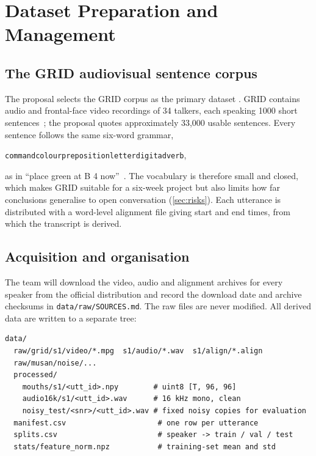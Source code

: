\section{Dataset Preparation and Management}
\label{sec:dataset}

\subsection{The GRID audiovisual sentence corpus}
The proposal selects the GRID corpus as the primary dataset \spec. GRID
contains audio and frontal-face video recordings of 34 talkers, each speaking
1000 short sentences~\cite{cooke2006}; the proposal quotes approximately
33{,}000 usable sentences. Every sentence follows the same six-word grammar,
\begin{center}
\small\texttt{command}\;\;\texttt{colour}\;\;\texttt{preposition}\;\;\texttt{letter}\;\;\texttt{digit}\;\;\texttt{adverb},
\end{center}
as in ``place green at B 4 now''~\cite{cooke2006}. The vocabulary is therefore
small and closed, which makes GRID suitable for a six-week project but also
limits how far conclusions generalise to open conversation (\cref{sec:risks}).
Each utterance is distributed with a word-level alignment file giving start
and end times, from which the transcript is derived.

\subsection{Acquisition and organisation}
The team will download the video, audio and alignment archives for every
speaker from the official distribution and record the download date and
archive checksums in \texttt{data/raw/SOURCES.md}. The raw files are never
modified. All derived data are written to a separate tree:

\begin{lstlisting}[language={},caption={Proposed data directory layout \rec.},label={lst:layout}]
data/
  raw/grid/s1/video/*.mpg  s1/audio/*.wav  s1/align/*.align
  raw/musan/noise/...
  processed/
    mouths/s1/<utt_id>.npy        # uint8 [T, 96, 96]
    audio16k/s1/<utt_id>.wav      # 16 kHz mono, clean
    noisy_test/<snr>/<utt_id>.wav # fixed noisy copies for evaluation
  manifest.csv                     # one row per utterance
  splits.csv                       # speaker -> train / val / test
  stats/feature_norm.npz           # training-set mean and std
\end{lstlisting}

